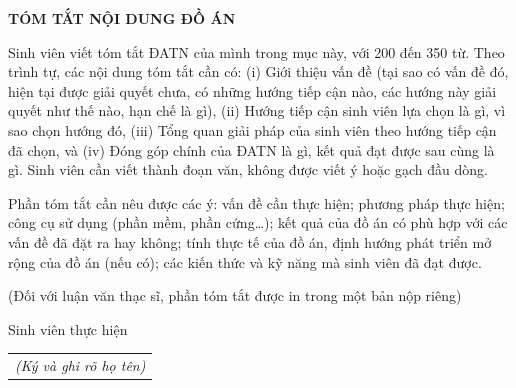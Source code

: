 \documentclass[../DoAn.tex]{subfiles}
\begin{document}
\begin{center}
    \Large{\textbf{TÓM TẮT NỘI DUNG ĐỒ ÁN}}\\
\end{center}
\vspace{1cm}
Sinh viên viết tóm tắt ĐATN của mình trong mục này, với 200 đến 350 từ. Theo trình tự, các nội dung tóm tắt cần có: (i) Giới thiệu vấn đề (tại sao có vấn đề đó, hiện tại được giải quyết chưa, có những hướng tiếp cận nào, các hướng này giải quyết như thế nào, hạn chế là gì), (ii) Hướng tiếp cận sinh viên lựa chọn là gì, vì sao chọn hướng đó, (iii) Tổng quan giải pháp của sinh viên theo hướng tiếp cận đã chọn, và (iv) Đóng góp chính của ĐATN là gì, kết quả đạt được sau cùng là gì. Sinh viên cần viết thành đoạn văn, không được viết ý hoặc gạch đầu dòng.

Phần tóm tắt cần nêu được các ý: vấn đề cần thực hiện; phương pháp thực hiện; công cụ sử dụng (phần mềm, phần cứng…); kết quả của đồ án có phù hợp với các vấn đề đã đặt ra hay không; tính thực tế của đồ án, định hướng phát triển mở rộng của đồ án (nếu có); các kiến thức và kỹ năng mà sinh viên đã đạt được.

(Đối với luận văn thạc sĩ, phần tóm tắt được in trong một bản nộp riêng)
\begin{flushright}
Sinh viên thực hiện\\
\begin{tabular}{@{}c@{}}
\textit{(Ký và ghi rõ họ tên)}
\end{tabular}
\end{flushright}
\end{document}
